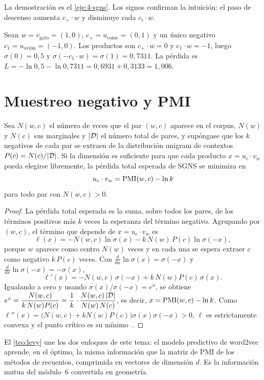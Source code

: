 La demostración es el \cref{eje:4-sgns}. Los signos confirman la intuición: el paso de descenso aumenta $c_{+}\cdot w$ y disminuye cada $c_{i}\cdot w$.

\begin{ejemplo}\label{ej:sgns}
Sean $w=v_{\text{gato}}=(1,0)$, $c_{+}=u_{\text{come}}=(0,1)$ y un único negativo $c_{1}=u_{\text{avión}}=(-1,0)$. Los productos son $c_{+}\cdot w=0$ y $c_{1}\cdot w=-1$, luego $\sigma(0)=0{,}5$ y $\sigma(-c_1\cdot w)=\sigma(1)=0{,}7311$. La pérdida es $L=-\ln 0{,}5-\ln 0{,}7311=0{,}6931+0{,}3133=1{,}006$.
\end{ejemplo}

\section{Muestreo negativo y PMI}

\begin{teorema}\label{teo:levy}
Sea $N(w,c)$ el número de veces que el par $(w,c)$ aparece en el corpus, $N(w)$ y $N(c)$ sus marginales y $\lvert\mathcal{D}\rvert$ el número total de pares, y supóngase que los $k$ negativos de cada par se extraen de la distribución unigram de contextos $P(c)=N(c)/\lvert\mathcal{D}\rvert$. Si la dimensión es suficiente para que cada producto $x=u_c\cdot v_w$ pueda elegirse libremente, la pérdida total esperada de SGNS se minimiza en
\[
u_c\cdot v_w=\operatorname{PMI}(w,c)-\ln k
\]
para todo par con $N(w,c)>0$.
\end{teorema}

\begin{proof}
La pérdida total esperada es la suma, sobre todos los pares, de los términos positivos más $k$ veces la esperanza del término negativo. Agrupando por $(w,c)$, el término que depende de $x=u_c\cdot v_w$ es
\[
\ell(x)=-N(w,c)\ln\sigma(x)-k\,N(w)\,P(c)\ln\sigma(-x),
\]
porque $w$ aparece como centro $N(w)$ veces y en cada una se espera extraer $c$ como negativo $k\,P(c)$ veces. Con $\frac{d}{dx}\ln\sigma(x)=\sigma(-x)$ y $\frac{d}{dx}\ln\sigma(-x)=-\sigma(x)$,
\[
\ell'(x)=-N(w,c)\,\sigma(-x)+k\,N(w)P(c)\,\sigma(x).
\]
Igualando a cero y usando $\sigma(x)/\sigma(-x)=e^{x}$, se obtiene $e^{x}=\dfrac{N(w,c)}{k\,N(w)P(c)}=\dfrac{1}{k}\cdot\dfrac{N(w,c)\,\lvert\mathcal{D}\rvert}{N(w)\,N(c)}$, es decir, $x=\operatorname{PMI}(w,c)-\ln k$. Como $\ell''(x)=\bigl(N(w,c)+kN(w)P(c)\bigr)\sigma(x)\sigma(-x)>0$, $\ell$ es estrictamente convexa y el punto crítico es su mínimo~\cite{levy}.
\end{proof}

\begin{observacion}
El \cref{teo:levy} une los dos enfoques de este tema: el modelo predictivo de word2vec aprende, en el óptimo, la misma información que la matriz de PMI de los métodos de recuentos, comprimida en vectores de dimensión $d$. Es la información mutua del módulo~6 convertida en geometría.
\end{observacion}

